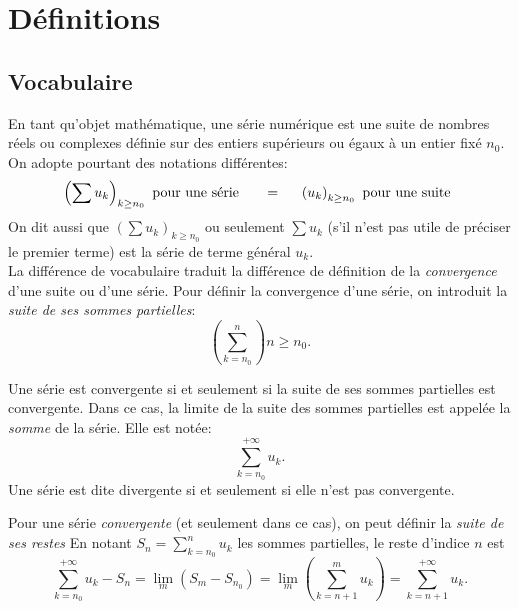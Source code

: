 

\section{Définitions}
\subsection{Vocabulaire}
En tant qu'objet mathématique, une série numérique est une suite de nombres réels ou complexes définie sur des entiers supérieurs ou égaux à un entier fixé $n_0$. On adopte pourtant des notations différentes:
\begin{displaymath}
  \left( \sum u_k \right)_{k\geq n_0} \text{ pour une série } \hspace{0.5cm} = \hspace{0.5cm} 
  \left( u_k \right)_{k\geq n_0} \text{ pour une suite }
\end{displaymath}
On dit aussi que $\left( \sum u_k \right)_{k\geq n_0}$ ou seulement $\sum u_k$ (s'il n'est pas utile de préciser le premier terme) est la série de terme général $u_k$.\\
La différence de vocabulaire traduit la différence de définition de la \emph{convergence} d'une suite ou d'une série. Pour définir la convergence d'une série, on introduit la \emph{suite de ses sommes partielles}: 
\begin{displaymath}
  \left( \sum_{k=n_0}^{n}\right)n\geq n_0 .
\end{displaymath}
\begin{defi}
  Une série est convergente si et seulement si la suite de ses sommes partielles est convergente. Dans ce cas, la limite de la suite des sommes partielles est appelée la \emph{somme} de la série. Elle est notée:
  \begin{displaymath}
    \sum_{k=n_0}^{+\infty} u_k .
  \end{displaymath}
  Une série est dite divergente si et seulement si elle n'est pas convergente.
\end{defi}
  
\newpage
Pour une série \emph{convergente} (et seulement dans ce cas), on peut définir la \emph{suite de ses restes}\newline
En notant $S_n = \sum_{k=n_0}^{n} u_k$ les sommes partielles, le reste d'indice $n$ est
\begin{displaymath}
  \sum_{k=n_0}^{+\infty} u_k - S_n = \underset{m}{\lim}\left( S_m - S_{n_0}\right)
= \underset{m}{\lim}\left( \sum_{k=n+1}^m u_k\right) =  \sum_{k=n+1}^{+\infty} u_k .
\end{displaymath}
